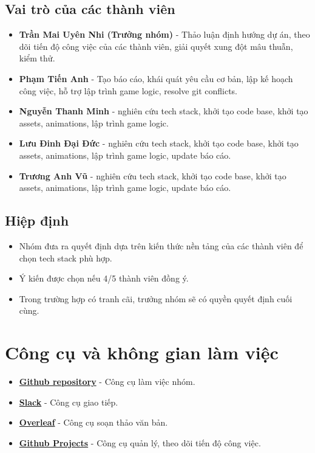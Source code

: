 \documentclass[a4paper, 12pt]{article}
\begin{document}
\subsection{Vai trò của các thành viên}
\begin{itemize}
    \item \textbf{Trần Mai Uyên Nhi (Trưởng nhóm)} - Thảo luận định hướng dự án, theo dõi tiến độ công việc của các thành viên, giải quyết xung đột mâu thuẫn, kiểm thử.
    \item \textbf{Phạm Tiến Anh} - Tạo báo cáo, khái quát yêu cầu cơ bản, lập kế hoạch công việc, hỗ trợ lập trình game logic, resolve git conflicts.
    \item \textbf{Nguyễn Thanh Minh} - nghiên cứu tech stack, khởi tạo code base, khởi tạo assets, animations, lập trình game logic.
    \item \textbf{Lưu Đinh Đại Đức} - nghiên cứu tech stack, khởi tạo code base, khởi tạo assets, animations, lập trình game logic, update báo cáo.
    \item \textbf{Trương Anh Vũ} - nghiên cứu tech stack, khởi tạo code base, khởi tạo assets, animations, lập trình game logic, update báo cáo.
\end{itemize}

\subsection{Hiệp định}
\begin{itemize}
    \item Nhóm đưa ra quyết định dựa trên kiến thức nền tảng của các thành viên để chọn tech stack phù hợp.
    \item Ý kiến được chọn nếu 4/5 thành viên đồng ý.
    \item Trong trường hợp có tranh cãi, trưởng nhóm sẽ có quyền quyết định cuối cùng.
\end{itemize}

\section{Công cụ và không gian làm việc}
\begin{itemize}
    \item \href{https://github.com/UIT-24730009/SnakeGame}{\large \textbf{Github repository}} - Công cụ làm việc nhóm.
    \item \href{https://app.slack.com/client/T07Q56DLLUX/C07U74U2XGF}{\large \textbf{Slack}} - Công cụ giao tiếp.
    \item \href{https://www.overleaf.com/project/67271c85e33c6e0dfe041c9d}{\large \textbf{Overleaf}} - Công cụ soạn thảo văn bản.
    \item \href{https://github.com/users/UIT-24730009/projects/1/views/1}{\large \textbf{Github Projects}} - Công cụ quản lý, theo dõi tiến độ công việc.
\end{itemize}
\end{document}
